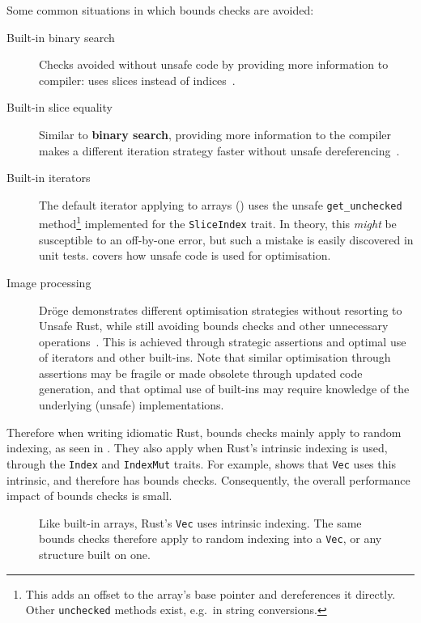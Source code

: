 \documentclass[dissertation.tex]{subfiles}
\begin{document}
Some common situations in which bounds checks are avoided:

\begin{description}
    \item[Built-in binary search] Checks avoided without unsafe code by
    providing more information to compiler: uses slices instead of
    indices~\cite{rust-pr-binarysearch}.
    \item[Built-in slice equality] Similar to \textbf{binary search},
    providing more information to the compiler makes a different
    iteration strategy faster without unsafe dereferencing~\cite{rust-pr-slice-partialeq}.
    \item[Built-in iterators] The default iterator applying to arrays
    () uses the unsafe
    \texttt{get\_unchecked} method\footnote{
    This adds an offset to the array's base pointer and dereferences it
    directly.
    Other \texttt{unchecked} methods exist, e.g.\ in string
    conversions.
    } implemented for the \texttt{SliceIndex} trait.
    In theory, this \emph{might} be susceptible to an off-by-one error,
    but such a mistake is easily discovered in unit tests.
     covers how unsafe code is used for optimisation.
    \item[Image processing] Dr\"oge demonstrates different optimisation
    strategies without resorting to Unsafe Rust, while still avoiding
    bounds checks and other unnecessary operations~\cite{droge-opt}.
    This is achieved through strategic assertions and optimal use of
    iterators and other built-ins.
    Note that similar optimisation through assertions may be fragile or
    made obsolete through updated code generation, and that optimal use
    of built-ins may require knowledge of the underlying (unsafe)
    implementations.
\end{description}

Therefore when writing idiomatic Rust, bounds checks mainly apply to
random indexing, as seen in .
They also apply when Rust's intrinsic indexing is used, through the
\texttt{Index} and \texttt{IndexMut} traits.
For example,  shows that \texttt{Vec} uses
this intrinsic, and therefore has bounds checks.
Consequently, the overall performance impact of bounds checks is small.

\begin{figure}[ht]
    
    \caption{
        Like built-in arrays, Rust's \texttt{Vec} uses intrinsic
        indexing.
        The same bounds checks therefore apply to random indexing into a
        \texttt{Vec}, or any structure built on one.
    }
    \label{lst:rust-vec-index}
\end{figure}
\end{document}
